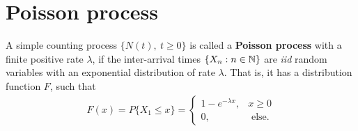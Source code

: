 \documentclass[a4paper,10pt,english]{article}
\begin{document}
\section{Poisson process}
A simple counting process $\{N(t),~ t\geqslant 0\} $ is called a \textbf{Poisson process} with a finite positive rate $\lambda$, 
if the inter-arrival times $\{X_{n}: n \in \mathbb{N}\}$ are \textit{iid} random variables with an exponential distribution of rate $\lambda$. 
That is, it has a distribution function $F$, such that 
 \begin{align*}
 F(x) = P\{X_{1}\leqslant x\} = 
	\begin{cases}
		1-e^{-\lambda x}, & x\geqslant 0   \\
		0,  & \text{ else}.
	\end{cases}
\end{align*}
\end{document}
